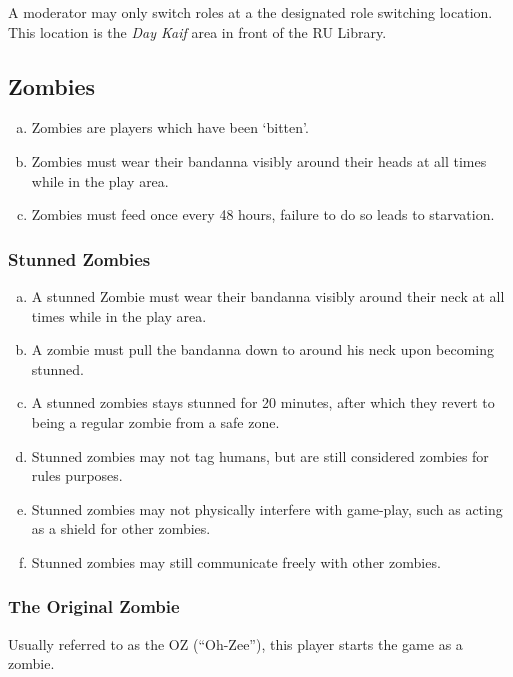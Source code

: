 \documentclass[a4paper,12pt]{article}
\begin{document}
A moderator may only switch roles at a the designated role switching location.
\\
This location is the \emph{Day Kaif} area in front of the RU Library.

\subsection{Zombies}

\begin{enumerate}[(a)]
    \item Zombies are players which have been `bitten'.
    \item Zombies must wear their bandanna visibly around their heads at all times while in the play area.
    \item Zombies must feed once every 48 hours, failure to do so leads to starvation.
\end{enumerate}

\subsubsection{Stunned Zombies}
\label{StunnedZombies}
\begin{enumerate}[(a)]
    \item A stunned Zombie must wear their bandanna visibly around their neck at all times while in the play area.
    \item A zombie must pull the bandanna down to around his neck upon becoming stunned.
    \item A stunned zombies stays stunned for 20 minutes, after which they revert to being a regular zombie from a safe zone.
    \item Stunned zombies may not tag humans, but are still considered zombies for rules purposes.
    \item Stunned zombies may not physically interfere with game-play, such as acting as a shield for other zombies.
    \item Stunned zombies may still communicate freely with other zombies.
\end{enumerate}


\subsubsection{The Original Zombie}
Usually referred to as the OZ (``Oh-Zee''), this player starts the game as a zombie.
\end{document}
